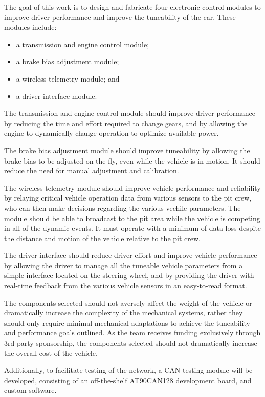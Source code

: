 The goal of this work is to design and fabricate four electronic control modules to improve driver performance and improve the tuneability of the car. These modules include:

\begin{itemize}
\item a transmission and engine control module;
\item a brake bias adjustment module;
\item a wireless telemetry module; and
\item a driver interface module.
\end{itemize}

The transmission and engine control module should improve driver performance by reducing the time and effort required to change gears, and by allowing the engine to dynamically change operation to optimize available power. 

The brake bias adjustment module should improve tuneability by allowing the brake bias to be adjusted on the fly, even while the vehicle is in motion. It should reduce the need for manual adjustment and calibration.

The wireless telemetry module should improve vehicle performance and reliability by relaying critical vehicle operation data from various sensors to the pit crew, who can then make decisions regarding the various vechile parameters. The module should be able to broadcast to the pit area while the vehicle is competing in all of the dynamic events. It must operate with a minimum of data loss despite the distance and motion of the vehicle relative to the pit crew.

The driver interface should reduce driver effort and improve vehicle performance by allowing the driver to manage all the tuneable vehicle parameters from a simple interface located on the steering wheel, and by providing the driver with real-time feedback from the various vehicle sensors in an easy-to-read format. 

The components selected should not aversely affect the weight of the vehicle or dramatically increase the complexity of the mechanical systems, rather they should only require minimal mechanical adaptations to achieve the tuneability and performance goals outlined. As the team receives funding exclusively through 3rd-party sponsorship, the components selected should not dramatically increase the overall cost of the vehicle.

Additionally, to facilitate testing of the network, a CAN testing module will be developed, consisting of an off-the-shelf AT90CAN128 development board, and custom software.

